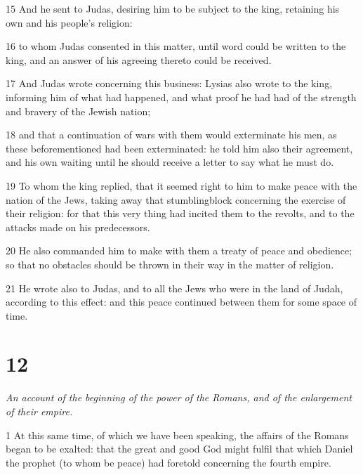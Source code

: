 \par 15 And he sent to Judas, desiring him to be subject to the king, retaining his own and his people’s religion: 

\par 16 to whom Judas consented in this matter, until word could be written to the king, and an answer of his agreeing thereto could be received. 

\par 17 And Judas wrote concerning this business: Lysias also wrote to the king, informing him of what had happened, and what proof he had had of the strength and bravery of the Jewish nation; 

\par 18 and that a continuation of wars with them would exterminate his men, as these beforementioned had been exterminated: he told him also their agreement, and his own waiting until he should receive a letter to say what he must do. 

\par 19 To whom the king replied, that it seemed right to him to make peace with the nation of the Jews, taking away that stumblingblock concerning the exercise of their religion: for that this very thing had incited them to the revolts, and to the attacks made on his predecessors. 

\par 20 He also commanded him to make with them a treaty of peace and obedience; so that no obstacles should be thrown in their way in the matter of religion. 

\par 21 He wrote also to Judas, and to all the Jews who were in the land of Judah, according to this effect: and this peace continued between them for some space of time. 


\chapter{12}

\par \textit{An account of the beginning of the power of the Romans, and of the enlargement of their empire.}

\par 1 At this same time, of which we have been speaking, the affairs of the Romans began to be exalted: that the great and good God might fulfil that which Daniel the prophet (to whom be peace) had foretold concerning the fourth empire. 

